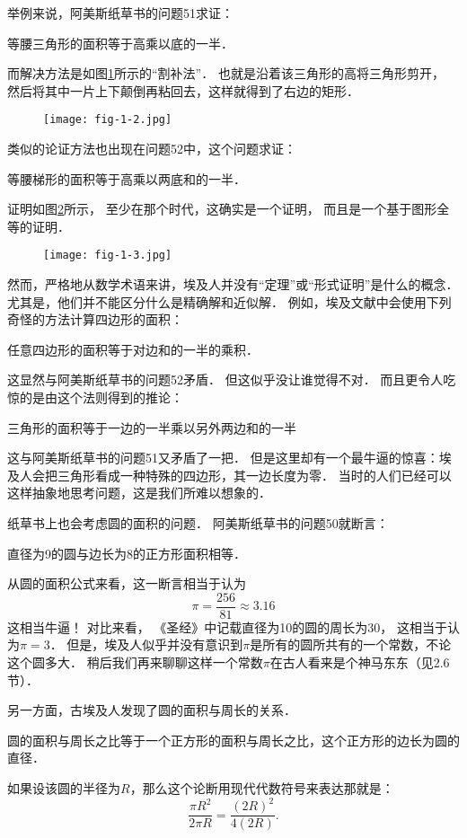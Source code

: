 \documentclass[cn,fancy,blue,11pt]{elegantbook}
\begin{document}
举例来说，阿美斯纸草书的问题51求证：
\begin{framed}
	等腰三角形的面积等于高乘以底的一半．
\end{framed}
而解决方法是如图\ref{fig:1-2}所示的``割补法''．
也就是沿着该三角形的高将三角形剪开，
然后将其中一片上下颠倒再粘回去，这样就得到了右边的矩形．
\begin{figure}[htbp]
	\centering
	\texttt{[image: fig-1-2.jpg]}
	\caption{\label{fig:1-2}}
\end{figure}
类似的论证方法也出现在问题52中，这个问题求证：
\begin{framed}
	等腰梯形的面积等于高乘以两底和的一半．
\end{framed}
证明如图\ref{fig:1-3}所示，
至少在那个时代，这确实是一个证明，
而且是一个基于图形全等的证明．
\begin{figure}[htbp]
	\centering
	\texttt{[image: fig-1-3.jpg]}
	\caption{\label{fig:1-3}}
\end{figure}

然而，严格地从数学术语来讲，埃及人并没有``定理''或``形式证明''是什么的概念．
尤其是，他们并不能区分什么是精确解和近似解．
例如，埃及文献中会使用下列奇怪的方法计算四边形的面积：
\begin{framed}
	任意四边形的面积等于对边和的一半的乘积．
\end{framed}
这显然与阿美斯纸草书的问题52矛盾．
但这似乎没让谁觉得不对．
而且更令人吃惊的是由这个法则得到的推论：
\begin{framed}
	三角形的面积等于一边的一半乘以另外两边和的一半
\end{framed}
这与阿美斯纸草书的问题51又矛盾了一把．
但是这里却有一个最牛逼的惊喜：埃及人会把三角形看成一种特殊的四边形，其一边长度为零．
当时的人们已经可以这样抽象地思考问题，这是我们所难以想象的．

纸草书上也会考虑圆的面积的问题．
阿美斯纸草书的问题50就断言：
\begin{framed}
	直径为9的圆与边长为8的正方形面积相等．
\end{framed}
从圆的面积公式来看，这一断言相当于认为
\[\pi=\frac{256}{81}\approx3.16\]
这相当牛逼！
对比来看，
《圣经》中记载直径为10的圆的周长为30，
这相当于认为$\pi=3$．
但是，埃及人似乎并没有意识到$\pi$是所有的圆所共有的一个常数，不论这个圆多大．
稍后我们再来聊聊这样一个常数$\pi$在古人看来是个神马东东（见2.6节）．

另一方面，古埃及人发现了圆的面积与周长的关系．
\begin{framed}
	圆的面积与周长之比等于一个正方形的面积与周长之比，这个正方形的边长为圆的直径．
\end{framed}
如果设该圆的半径为$R$，那么这个论断用现代代数符号来表达那就是：
\[\frac{\pi R^2}{2\pi R}=\frac{(2R)^2}{4(2R)}.\]
\end{document}
